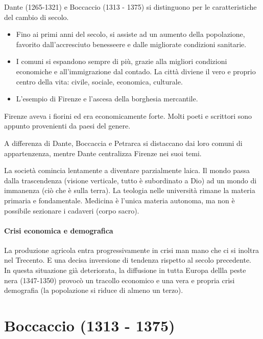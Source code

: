 \documentclass[a4paper]{article}
\begin{document}
Dante (1265-1321) e Boccaccio (1313 - 1375)
si distinguono per le caratteristiche del cambio di secolo.

\begin{itemize}
    \item Fino ai primi anni del secolo, si assiste ad un aumento della popolazione, favorito dall'accresciuto benesseere e dalle migliorate condizioni sanitarie.
    \item I comuni si espandono sempre di più, grazie alla migliori condizioni economiche e all'immigrazione dal contado. La città diviene il vero e proprio centro della vita: civile, sociale, economica, culturale.
    \item L'esempio di Firenze e l'ascesa della borghesia mercantile.
\end{itemize}

Firenze aveva i fiorini ed era economicamente forte.
Molti poeti e scrittori sono appunto provenienti da paesi del genere.

A differenza di Dante, Boccaccia e Petrarca si distaccano dai loro comuni di appartenzenza,
mentre Dante centralizza Firenze nei suoi temi.

La società comincia lentamente a diventare parzialmente laica.
Il mondo passa dalla trascendenza (visione verticale, tutto è subordinato a Dio)
ad un mondo di immanenza (ciò che è sulla terra).
La teologia nelle università rimane la materia primaria e fondamentale. Medicina è l'unica materia autonoma, ma non è possibile sezionare i cadaveri (corpo sacro).

\subsection{Crisi economica e demografica}

La produzione agricola entra progressivamente in crisi man mano che ci si inoltra nel Trecento.
E una decisa inversione di tendenza rispetto al secolo precedente.\\
In questa situazione già deteriorata, la diffusione in tutta Europa dellla peste nera (1347-1350) provocò
un tracollo economico e una vera e propria crisi demografia (la popolazione si riduce di almeno un terzo).


\pagebreak

\part{Boccaccio (1313 - 1375)}
\end{document}
